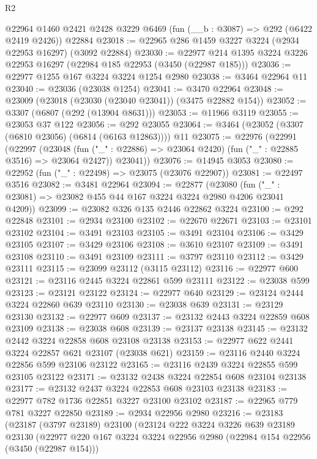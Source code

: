 \begin{lexlean}{R2}
\begin{coremodule}
    @22964
    @1460
    @2421
    @2428
    @3229
    @6469
    (fun (__b : @3087) => @292 (@6422 @2419 @2426))
    @22884
@23018 := @22965 @286 @1459 @3227 @3224 (@2934 @22953 @16297) (@3092 @22884)
@23030 := @22977 @214 @1395 @3224 @3226 @22953 @16297 (@22984 @185 @22953 (@3450 (@22987 @185)))
@23036 := @22977 @1255 @167 @3224 @3224 @1254 @2980
@23038 := @3464 @22964 @11
@23040 := @23036 (@23038 @1254)
@23041 := @3470 @22964
@23048 := @23009 (@23018 (@23030 (@23040 @23041)) (@3475 @22882 @154))
@23052 := @3307 (@6807 (@292 (@13904 @8631)))
@23053 := @11966 @3119
@23055 := @23053 @37 @122
@23056 := @292 @23055
@23064 := @3464 (@23052 (@3307 (@6810 @23056) (@6814 (@6163 @12863)))) @11
@23075 := @22976
    (@22991
      (@22997
        (@23048 (fun ("_" : @22886) => @23064 @2420) (fun ("_" : @22885 @3516) => @23064 @2427))
        @23041))
@23076 := @14945 @3053
@23080 := @22952 (fun ("_" : @22498) => @23075 (@23076 @22907))
@23081 := @22497 @3516
@23082 := @3481 @22964
@23094 := @22877
    (@23080 (fun ("_" : @23081) => @23082 @455 @44 @167 @3224 @3224 @2980 @4206 @23041 @4209))
@23099 := @23082 @326 @135 @2446 @22862 @3224
@23100 := @292 @22848
@23101 := @2934 @23100
@23102 := @22670 @22671
@23103 := @23101 @23102
@23104 := @3491 @23103
@23105 := @3491 @23104
@23106 := @3429 @23105
@23107 := @3429 @23106
@23108 := @3610 @23107
@23109 := @3491 @23108
@23110 := @3491 @23109
@23111 := @3797 @23110
@23112 := @3429 @23111
@23115 := @23099 @23112 (@3115 @23112)
@23116 := @22977 @600
@23121 := @23116 @2445 @3224 @22861 @599 @23111
@23122 := @23038 @599
@23123 := @23121 @23122
@23124 := @22977 @640
@23129 := @23124 @2444 @3224 @22860 @639 @23110
@23130 := @23038 @639
@23131 := @23129 @23130
@23132 := @22977 @609
@23137 := @23132 @2443 @3224 @22859 @608 @23109
@23138 := @23038 @608
@23139 := @23137 @23138
@23145 := @23132 @2442 @3224 @22858 @608 @23108 @23138
@23153 := @22977 @622 @2441 @3224 @22857 @621 @23107 (@23038 @621)
@23159 := @23116 @2440 @3224 @22856 @599 @23106 @23122
@23165 := @23116 @2439 @3224 @22855 @599 @23105 @23122
@23171 := @23132 @2438 @3224 @22854 @608 @23104 @23138
@23177 := @23132 @2437 @3224 @22853 @608 @23103 @23138
@23183 := @22977 @782 @1736 @22851 @3227 @23100 @23102
@23187 := @22965 @779 @781 @3227 @22850
@23189 := @2934 @22956 @2980
@23216 := @23183
    (@23187
      (@3797 @23189)
      @23100
      (@23124
        @222
        @3224
        @3226
        @639
        @23189
        @23130
        (@22977
          @220
          @167
          @3224
          @3224
          @22956
          @2980
          (@22984 @154 @22956 (@3450 (@22987 @154)))

\end{coremodule}
\end{lexlean}
